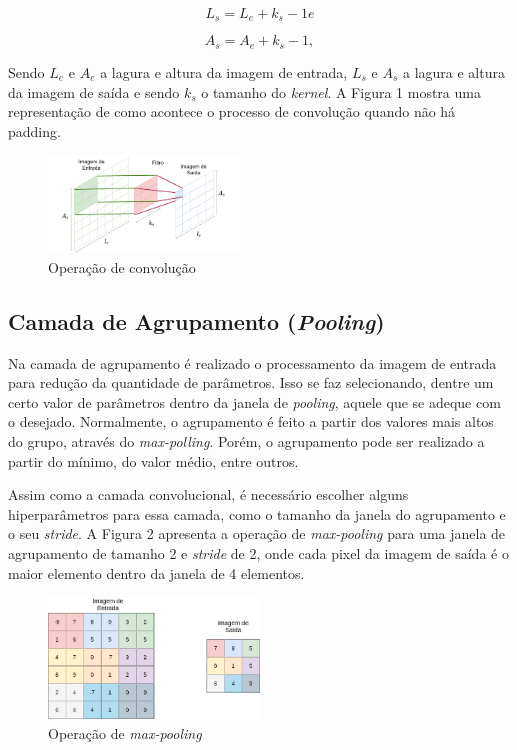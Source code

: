 \begin{equation}
    L_s = L_e + k_s - 1 e
\end{equation}

\begin{equation}
    A_s = A_e + k_s - 1,
\end{equation}

Sendo $L_e$ e $A_e$ a lagura e altura da imagem de entrada, $L_s$ e $A_s$ a lagura e altura da imagem de saída e sendo $k_s$ o tamanho do \textit{kernel}. A Figura 1 mostra uma representação de como acontece o processo de convolução quando não há padding.

\begin{figure}[H]
	\includegraphics[width=0.45\textwidth, keepaspectratio=true]{figuras/CAP4/convv.png}
	\centering
	\caption[Operação de convolução]{Operação de convolução}
\end{figure}

\subsection{Camada de Agrupamento (\textit{Pooling})}
Na camada de agrupamento é realizado o processamento da imagem de entrada para redução da quantidade de parâmetros. Isso se faz selecionando, dentre um certo valor de parâmetros dentro da janela de \textit{pooling}, aquele que se adeque com o desejado. Normalmente, o agrupamento é feito a partir dos valores mais altos do grupo, através do \textit{max-polling}. Porém, o agrupamento pode ser realizado a partir do mínimo, do valor médio, entre outros.

Assim como a camada convolucional, é necessário escolher alguns hiperparâmetros para essa camada, como o tamanho da janela do agrupamento e o seu \textit{stride}. A Figura 2 apresenta a operação de \textit{max-pooling} para uma janela de agrupamento de tamanho 2 e \textit{stride} de 2, onde cada pixel da imagem de saída é o maior elemento dentro da janela de 4 elementos.

\begin{figure}[H]
	\includegraphics[width=0.5\textwidth, keepaspectratio=true]{figuras/poolig.png}
	\centering
	\caption[Operação de \textit{max-pooling}]{Operação de \textit{max-pooling}}
\end{figure}

